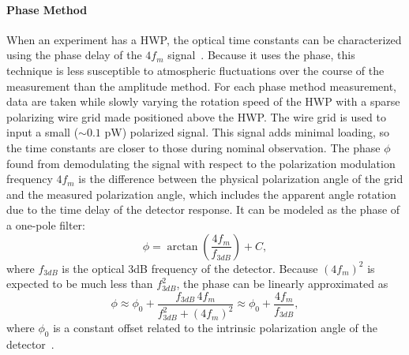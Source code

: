 \paragraph{Phase Method} When an experiment has a HWP, the optical time constants can be characterized using the phase delay of the $4f_{m}$ signal~\cite{Simon_LTD2013}. Because it uses the phase, this technique is less susceptible to atmospheric fluctuations over the course of the measurement than the amplitude method. For each phase method measurement, data are taken while slowly varying the rotation speed of the HWP with a sparse polarizing wire grid made positioned above the HWP. The wire grid is used to input a small ($\sim0.1$ pW) polarized signal. This signal adds minimal loading, so the time constants are closer to those during nominal observation. The phase $\phi$ found from demodulating the signal with respect to the polarization modulation frequency $4f_{m}$ is the difference between the physical polarization angle of the grid and the measured polarization angle, which includes the apparent angle rotation due to the time delay of the detector response. It can be modeled as the phase of a one-pole filter: 
\begin{equation}\label{eqn:phi_shift}
\phi=\arctan{\left(\frac{4f_{m}}{f_{3dB}}\right)} + C,
\end{equation}
where $f_{3dB}$ is the optical 3dB frequency of the detector. Because $(4f_{m})^2$ is expected to be much less than $f_{3dB}^2$, the phase can be linearly approximated as 
\begin{equation}
\phi  \approx \phi_0 + \frac{f_{3dB}\,4f_{m}}{f_{3dB}^2+(4f_{m})^2}\approx  \phi_0 + \frac{4f_{m}}{f_{3dB}},
\end{equation}
where $\phi_0$ is a constant offset related to the intrinsic polarization angle of the detector~\cite{Simon_LTD2013}. 
